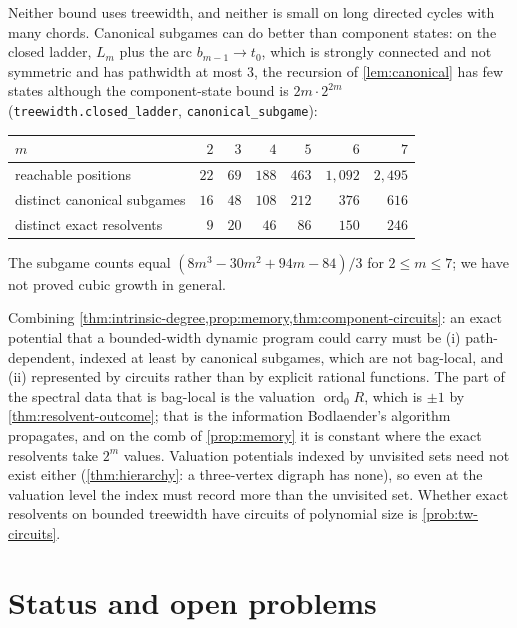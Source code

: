 \documentclass[final]{siamart0516}
\numberwithin{theorem}{section}
\numberwithin{equation}{section}
\theoremstyle{siamnonum}
\theoremstyle{plain}
\newcommand{\code}[1]{{\ttfamily\nolinkurl{#1}}}
\newcommand{\ord}{\operatorname{ord}}
\begin{document}
Neither bound uses treewidth, and neither is small on long directed cycles with many chords. Canonical subgames can do better than component states: on the closed ladder, $L_m$ plus the arc $b_{m-1}\to t_0$, which is strongly connected and not symmetric and has pathwidth at most $3$, the recursion of \cref{lem:canonical} has few states although the component-state bound is $2m\cdot2^{2m}$ \textup{(}\code{treewidth.closed_ladder}, \code{canonical_subgame}\textup{)}:
\begin{center}\small
\begin{tabular}{@{}lrrrrrr@{}}
\toprule
$m$ & $2$ & $3$ & $4$ & $5$ & $6$ & $7$\\ \midrule
reachable positions & $22$ & $69$ & $188$ & $463$ & $1{,}092$ & $2{,}495$\\
distinct canonical subgames & $16$ & $48$ & $108$ & $212$ & $376$ & $616$\\
distinct exact resolvents & $9$ & $20$ & $46$ & $86$ & $150$ & $246$\\
\bottomrule
\end{tabular}
\end{center}
The subgame counts equal $(8m^{3}-30m^{2}+94m-84)/3$ for $2\le m\le7$; we have not proved cubic growth in general.

\begin{remark}\label{rem:bodlaender}
Combining \cref{thm:intrinsic-degree,prop:memory,thm:component-circuits}: an exact potential that a bounded-width dynamic program could carry must be (i) path-dependent, indexed at least by canonical subgames, which are not bag-local, and (ii) represented by circuits rather than by explicit rational functions. The part of the spectral data that is bag-local is the valuation $\ord_0R$, which is $\pm1$ by \cref{thm:resolvent-outcome}; that is the information Bodlaender's algorithm propagates, and on the comb of \cref{prop:memory} it is constant where the exact resolvents take $2^{m}$ values. Valuation potentials indexed by unvisited sets need not exist either (\cref{thm:hierarchy}: a three-vertex digraph has none), so even at the valuation level the index must record more than the unvisited set. Whether exact resolvents on bounded treewidth have circuits of polynomial size is \cref{prob:tw-circuits}.
\end{remark}

\section{Status and open problems}\label{sec:open}
\end{document}
